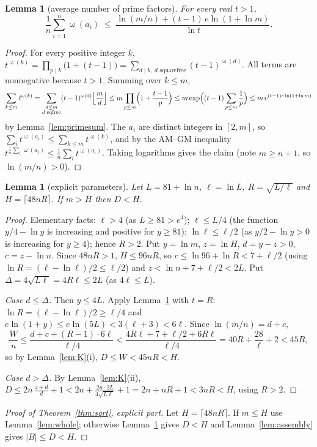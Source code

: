 \documentclass[11pt]{article}
\newtheorem{lemma}[theorem]{Lemma}
\theoremstyle{definition}
\DeclareMathOperator{\om}{\omega}
\begin{document}
\begin{lemma}[average number of prime factors]\label{lem:omega}
For every real $t>1$,
\[
 \frac1n\sum_{i=1}^n\om(a_i)\;\le\;\frac{\ln(m/n)+(t-1)\,e\ln(1+\ln m)}{\ln t}.
\]
\end{lemma}
\begin{proof}
For every positive integer $k$, $t^{\om(k)}=\prod_{p\mid k}\bigl(1+(t-1)\bigr)=\sum_{d\mid k,\ d\text{ squarefree}}(t-1)^{\om(d)}$.
All terms are nonnegative because $t>1$. Summing over $k\le m$,
\[
 \sum_{k\le m}t^{\om(k)}=\sum_{\substack{d\le m\\ d\text{ sqfree}}}(t-1)^{\om(d)}\Bigl\lfloor\frac md\Bigr\rfloor
 \le m\prod_{p\le m}\Bigl(1+\frac{t-1}p\Bigr)\le m\exp\Bigl((t-1)\sum_{p\le m}\frac1p\Bigr)
 \le m\,e^{(t-1)e\ln(1+\ln m)}
\]
by Lemma~\ref{lem:primesum}. The $a_i$ are distinct integers in $[2,m]$, so
$\sum_i t^{\om(a_i)}\le\sum_{k\le m}t^{\om(k)}$, and by the AM--GM inequality
$t^{\frac1n\sum_i\om(a_i)}\le\frac1n\sum_i t^{\om(a_i)}$. Taking logarithms gives the claim (note $m\ge n+1$, so $\ln(m/n)>0$).
\end{proof}

\begin{lemma}[explicit parameters]\label{lem:explicit}
Let $L=81+\ln n$, $\ell=\ln L$, $R=\sqrt{L/\ell}$ and $H=\lceil 48nR\rceil$. If $m>H$ then $D<H$.
\end{lemma}
\begin{proof}
Elementary facts: $\ell>4$ (as $L\ge 81>e^4$); $\ell\le L/4$ (the function $y/4-\ln y$ is increasing and
positive for $y\ge 81$); $\ln\ell\le\ell/2$ (as $y/2-\ln y>0$ is increasing for $y\ge 4$); hence
$R>2$. Put $y=\ln m$, $z=\ln H$, $d=y-z>0$, $c=z-\ln n$. Since $48nR>1$, $H\le 96nR$, so
$c\le\ln 96+\ln R<7+\ell/2$ (using $\ln R=(\ell-\ln\ell)/2\le\ell/2$) and $z<\ln n+7+\ell/2<2L$. Put
$\Delta=4\sqrt{L\ell}=4R\ell\le 2L$ (as $4\ell\le L$).

\emph{Case $d\le\Delta$.} Then $y\le 4L$. Apply Lemma~\ref{lem:omega} with $t=R$: $\ln R=(\ell-\ln\ell)/2\ge\ell/4$
and $e\ln(1+y)\le e\ln(5L)<3(\ell+3)<6\ell$. Since $\ln(m/n)=d+c$,
\[
 \frac Wn\le\frac{d+c+(R-1)\cdot 6\ell}{\ell/4}<\frac{4R\ell+7+\ell/2+6R\ell}{\ell/4}=40R+\frac{28}{\ell}+2<45R,
\]
so by Lemma~\ref{lem:K}(i), $D\le W<45nR<H$.

\emph{Case $d>\Delta$.} By Lemma~\ref{lem:K}(ii),
$D\le 2n\,\frac{z+d}{d}+1<2n+\frac{2n\cdot 2L}{4\sqrt{L\ell}}+1=2n+nR+1<3nR<H$, using $R>2$.
\end{proof}

\begin{proof}[Proof of Theorem~\ref{thm:sqrt}, explicit part]
Let $H=\lceil 48nR\rceil$. If $m\le H$ use Lemma~\ref{lem:whole}; otherwise Lemma~\ref{lem:explicit} gives
$D<H$ and Lemma~\ref{lem:assembly} gives $|B|\le D<H$.
\end{proof}
\end{document}
